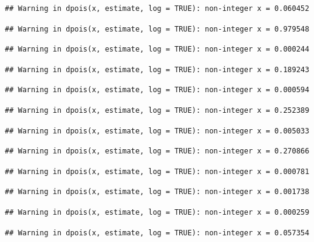 \documentclass[]{article}
\begin{document}
\begin{verbatim}
## Warning in dpois(x, estimate, log = TRUE): non-integer x = 0.060452
\end{verbatim}

\begin{verbatim}
## Warning in dpois(x, estimate, log = TRUE): non-integer x = 0.979548
\end{verbatim}

\begin{verbatim}
## Warning in dpois(x, estimate, log = TRUE): non-integer x = 0.000244
\end{verbatim}

\begin{verbatim}
## Warning in dpois(x, estimate, log = TRUE): non-integer x = 0.189243
\end{verbatim}

\begin{verbatim}
## Warning in dpois(x, estimate, log = TRUE): non-integer x = 0.000594
\end{verbatim}

\begin{verbatim}
## Warning in dpois(x, estimate, log = TRUE): non-integer x = 0.252389
\end{verbatim}

\begin{verbatim}
## Warning in dpois(x, estimate, log = TRUE): non-integer x = 0.005033
\end{verbatim}

\begin{verbatim}
## Warning in dpois(x, estimate, log = TRUE): non-integer x = 0.270866
\end{verbatim}

\begin{verbatim}
## Warning in dpois(x, estimate, log = TRUE): non-integer x = 0.000781
\end{verbatim}

\begin{verbatim}
## Warning in dpois(x, estimate, log = TRUE): non-integer x = 0.001738
\end{verbatim}

\begin{verbatim}
## Warning in dpois(x, estimate, log = TRUE): non-integer x = 0.000259
\end{verbatim}

\begin{verbatim}
## Warning in dpois(x, estimate, log = TRUE): non-integer x = 0.057354
\end{verbatim}
\end{document}

